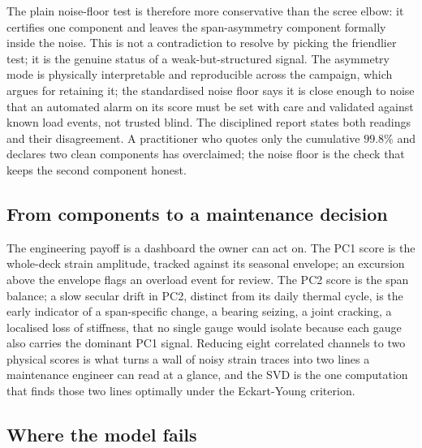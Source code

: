 The plain noise-floor test is therefore more conservative than the scree
elbow: it certifies one component and leaves the span-asymmetry
component formally inside the noise. This is not a contradiction to
resolve by picking the friendlier test; it is the genuine status of a
weak-but-structured signal. The asymmetry mode is physically
interpretable and reproducible across the campaign, which argues for
retaining it; the standardised noise floor says it is close enough to
noise that an automated alarm on its score must be set with care and
validated against known load events, not trusted blind. The disciplined
report states both readings and their disagreement. A practitioner who
quotes only the cumulative $99.8\%$ and declares two clean components
has overclaimed; the noise floor is the check that keeps the second
component honest.

\subsection{From components to a maintenance decision}

The engineering payoff is a dashboard the owner can act on. The PC1
score is the whole-deck strain amplitude, tracked against its seasonal
envelope; an excursion above the envelope flags an overload event for
review. The PC2 score is the span balance; a slow secular drift in PC2,
distinct from its daily thermal cycle, is the early indicator of a
span-specific change, a bearing seizing, a joint cracking, a localised
loss of stiffness, that no single gauge would isolate because each gauge
also carries the dominant PC1 signal. Reducing eight correlated channels
to two physical scores is what turns a wall of noisy strain traces into
two lines a maintenance engineer can read at a glance, and the SVD is
the one computation that finds those two lines optimally under the
Eckart-Young criterion.

\subsection{Where the model fails}

